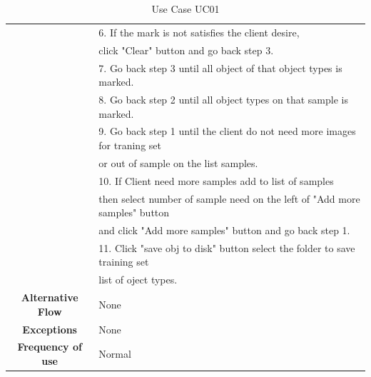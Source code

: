 \begin{table}[H]
\begin{center}
\begin{tabular}{ | c | l | }
    & 6. If the mark is not satisfies the client desire, \\
    & click "Clear" button and go back step 3. \\
    & 7. Go back step 3 until all object of that object types is marked. \\
    & 8. Go back step 2 until all object types on that sample is marked. \\
    & 9. Go back step 1 until the client do not need more images for traning set \\
    & or out of sample on the list samples. \\
    & 10. If Client need more samples add to list of samples \\
    & then select number of sample need on the left of "Add more samples" button \\
    & and click "Add more samples" button and go back step 1. \\
    & 11. Click "save obj to disk" button select the folder to save training set\\
    & list of oject types.\\
    \hline
    \textbf{Alternative Flow} & None \\
    \hline
    \textbf{Exceptions} & None \\
    \hline
    \textbf{Frequency of use} & Normal \\
    \hline
    \end{tabular}
  \end{center}
  \caption{Use Case UC01}\label{tab:uc1}
\end{table}

